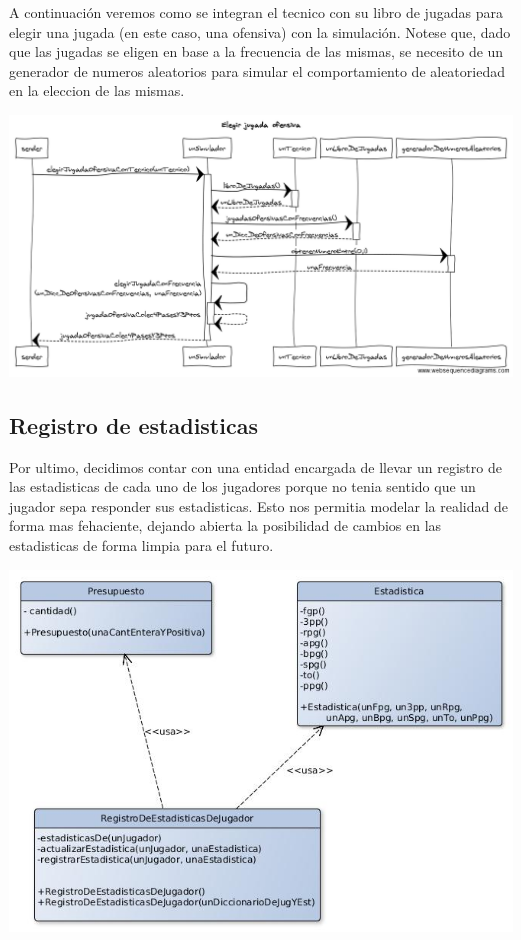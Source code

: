 A continuación veremos como se integran el tecnico con su libro de jugadas para elegir una jugada (en este caso, una ofensiva) con la simulación. Notese que, dado que las jugadas se eligen en base a la frecuencia de las mismas, se necesito de un generador de numeros aleatorios para simular el comportamiento de aleatoriedad en la eleccion de las mismas.
\begin{center}
\includegraphics[scale=0.30]{diseno/Elegir_jugada_ofensiva.png} 
\end{center}


\subsection{Registro de estadisticas}
Por ultimo, decidimos contar con una entidad encargada de llevar un registro de las estadisticas de cada uno de los jugadores porque no tenia sentido que un jugador sepa responder sus estadisticas. Esto nos permitia modelar la realidad de forma mas fehaciente, dejando abierta la posibilidad de cambios en las estadisticas de forma limpia para el futuro.
\begin{center}
\includegraphics[scale=0.4]{diseno/registroDeEstadisticas.jpg}
\end{center}

